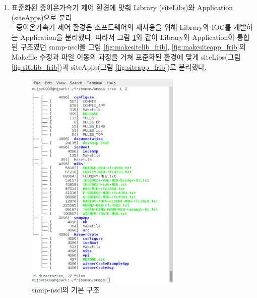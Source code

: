 \documentclass[11pt
  , a4paper
  , article
  , oneside
]{memoir}
\begin{document}
\clearpage

\begin{enumerate}
\item 표준화된 중이온가속기 제어 환경에 맞춰 Library (siteLibs)와 Application (siteApps)으로 분리\\
- 중이온가속기 제어 환경은 소프트웨어의 재사용을 위해 Library와 IOC를 개발하는 Application을 분리했다. 따라서 그림 \ref{fig:fribtree}와 같이 Library와 Application이 통합된 구조였던 snmp-nscl을 그림 \ref{fig:makesitelib_frib}, \ref{fig:makesiteapp_frib}의 Makefile 수정과 파일 이동의 과정을 거쳐 표준화된 환경에 맞게 siteLibs(그림 \ref{fig:sitelib_frib})과 siteApps(그림 \ref{fig:siteapp_frib})로 분리했다.

\begin{figure}[h!]
  \centering
  \includegraphics[width=0.7\textwidth]{./images/fribmoduletree.eps}
  \caption{snmp-nscl의 기본 구조}
  \label{fig:fribtree} 
\end{figure}

\clearpage


\end{enumerate}
\end{document}
